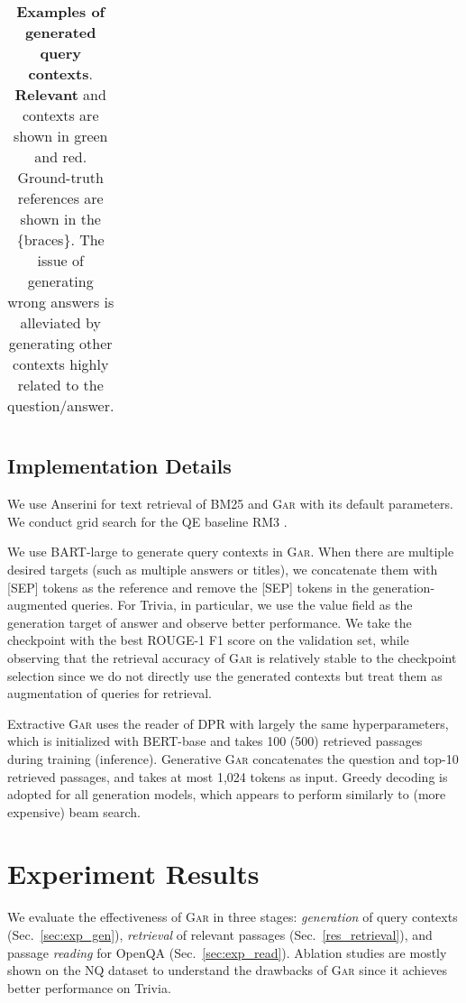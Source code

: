 \documentclass[11pt,a4paper]{article}
\newcommand{\upv}{\vspace{-.0cm}}
\newcommand{\downv}{\vspace{-.1cm}}
\newcommand{\ours}{\textsc{Gar}\xspace}
\newcommand{\colorG}[1]{\textcolor{ggreen}{\textbf{#1}}}
\newcommand{\colorB}[1]{\textcolor{gblue}{#1}}
\begin{document}
\begin{table*}[ht]
{\begin{tabular}{p{17cm}}
            \bottomrule
        \end{tabular}
        }
    \upv
    \caption{\textbf{Examples of generated query contexts}. \colorG{Relevant} and  contexts are shown in green and red. \colorB{Ground-truth references} are shown in the \{braces\}. The issue of generating wrong answers is alleviated by generating other contexts highly related to the question/answer.}
    \label{tab:generation_eg}
    \downv
    \end{table*} 
\subsection{Implementation Details}
We use Anserini \cite{yang2017anserini} for text retrieval of BM25 and \ours with its default parameters.
We conduct grid search for the QE baseline RM3 \cite{abdul2004umass}.

We use BART-large \cite{lewis2019bart} to generate query contexts in \ours.
When there are multiple desired targets (such as multiple answers or titles), we concatenate them with [SEP] tokens as the reference and remove the [SEP] tokens in the generation-augmented queries.
For Trivia, in particular, we use the value field as the generation target of answer and observe better performance.
We take the checkpoint with the best ROUGE-1 F1 score on the validation set, while observing that the retrieval accuracy of \ours is relatively stable to the checkpoint selection since we do not directly use the generated contexts but treat them as augmentation of queries for retrieval.

Extractive \ours uses the reader of DPR with largely the same hyperparameters, which is initialized with BERT-base \cite{devlin-etal-2019-bert} and takes 100 (500) retrieved passages during training (inference).
Generative \ours concatenates the question and top-10 retrieved passages, and takes at most 1,024 tokens as input.
Greedy decoding is adopted for all generation models, which appears to perform similarly to (more expensive) beam search.


 
\section{Experiment Results}
We evaluate the effectiveness of \ours in three stages: \textit{generation} of query contexts (Sec.~\ref{sec:exp_gen}), \textit{retrieval} of relevant passages (Sec.~\ref{res_retrieval}), and passage \textit{reading} for OpenQA (Sec.~\ref{sec:exp_read}).
Ablation studies are mostly shown on the NQ dataset to understand the drawbacks of \ours since it achieves better performance on Trivia.
\end{document}
